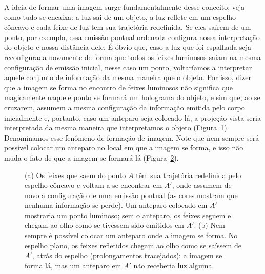 \documentclass[11pt,a4paper]{article}
\begin{document}
A ideia de formar uma imagem surge fundamentalmente desse conceito; veja como
tudo se encaixa: a luz sai de um objeto, a luz reflete em um espelho côncavo e
cada feixe de luz tem sua trajetória redefinida. Se eles saírem de um ponto, por
exemplo, essa emissão pontual ordenada configura nossa interpretação do objeto e
nossa distância dele. É óbvio que, caso a luz que foi espalhada seja
reconfigurada novamente de forma que todos os feixes luminosos saiam na mesma
configuração de emissão inicial, nesse caso um ponto, voltaríamos a interpretar
aquele conjunto de informação da mesma maneira que o objeto. Por isso, dizer que
a imagem se forma no encontro de feixes luminosos não significa que magicamente
naquele ponto se formará um holograma do objeto, e sim que, ao se cruzarem,
assumem a mesma configuração da informação emitida pelo corpo inicialmente e,
portanto, caso um anteparo seja colocado lá, a projeção vista seria interpretada
da mesma maneira que interpretamos o objeto (Figura~\ref{fig:imagem-real}).
Denominamos esse fenômeno de formação de imagem. Note que nem sempre será
possível colocar um anteparo no local em que a imagem se forma, e isso não muda o
fato de que a imagem se formará lá (Figura~\ref{fig:espelho-plano}).

\begin{figure}[!ht]
  \centering
  \begin{subfigure}{\textwidth}
    \centering
    
    \caption{}\label{fig:imagem-real}
  \end{subfigure}

  \bigskip
  \begin{subfigure}{\textwidth}
    \centering
    
    \caption{}\label{fig:espelho-plano}
  \end{subfigure}
  \caption{(a) Os feixes que saem do ponto $A$ têm sua trajetória redefinida pelo
    espelho côncavo e voltam a se encontrar em $A'$, onde assumem de novo a
    configuração de uma emissão pontual (as cores mostram que nenhuma informação
    se perde). Um anteparo colocado em $A'$ mostraria um ponto luminoso; sem o
    anteparo, os feixes seguem e chegam ao olho como se tivessem sido emitidos
    em $A'$. (b) Nem sempre é possível colocar um anteparo onde a imagem se
    forma. No espelho plano, os feixes refletidos chegam ao olho como se saíssem
    de $A'$, atrás do espelho (prolongamentos tracejados): a imagem se forma lá,
    mas um anteparo em $A'$ não receberia luz alguma.}
  \label{fig:formacao}
\end{figure}
\end{document}
